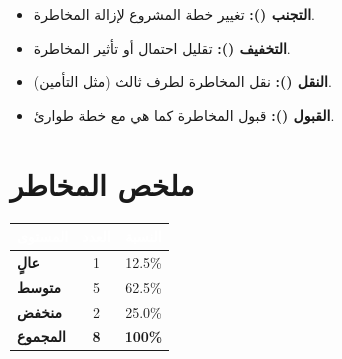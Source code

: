 \documentclass[11pt,a4paper,landscape]{article}
\begin{document}
\begin{itemize}
    \item \textbf{التجنب ():} تغيير خطة المشروع لإزالة المخاطرة.
    \item \textbf{التخفيف ():} تقليل احتمال أو تأثير المخاطرة.
    \item \textbf{النقل ():} نقل المخاطرة لطرف ثالث (مثل التأمين).
    \item \textbf{القبول ():} قبول المخاطرة كما هي مع خطة طوارئ.
\end{itemize}

\section*{ملخص المخاطر}

\begin{tabular}{|l|c|c|}
\hline
\rowcolor{headerColor}
\textcolor{white}{\textbf{المستوى}} & \textcolor{white}{\textbf{العدد}} & \textcolor{white}{\textbf{النسبة}} \\
\hline
\color{riskHigh}\textbf{عالٍ} & 1 & 12.5\% \\
\hline
\color{riskMed}\textbf{متوسط} & 5 & 62.5\% \\
\hline
\color{riskLow}\textbf{منخفض} & 2 & 25.0\% \\
\hline
\textbf{المجموع} & \textbf{8} & \textbf{100\%} \\
\hline
\end{tabular}
\end{document}
